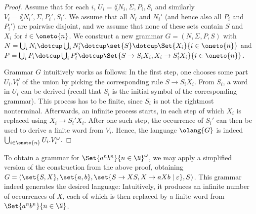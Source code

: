 \documentclass[../../diss.tex]{subfiles}
\begin{document}
\begin{proof}
    Assume that for each $i$, $U_i = \lang{N_i,\Sigma,P_i,S_i}$ and similarly $V_i = \lang{N_i',\Sigma,P_i',S_i'}$.
    We assume \wolog that all $N_i$ and $N_i'$ (and hence also all $P_i$ and $P_i'$) are pairwise disjoint, and we assume that none of these sets contain $S$ and $X_i$ for $i \in \oneto{n}$.
    We construct a new grammar $G = (N,\Sigma,P,S)$ with
    \(
        N = \bigcup_{i} N_i \dotcup \bigcup_{i} N'_i \dotcup \set{ S } \dotcup \Set{ X_i}{i \in \oneto{n}}
    \)
    and
    \(
        P = \bigcup_{i} P_i \dotcup \bigcup_{i} P_i' \dotcup \Set{ S \to S_i X_i, X_i \to S_i' X_i}{i \in \oneto{n}}
    \).

    Grammar $G$ intuitively works as follows:
    In the first step, one chooses some part $U_i . V_i^\omega$ of the union by picking the corresponding rule $S \to S_i X_i$.
    From $S_i$, a word in $U_i$ can be derived (recall that $S_i$ is the initial symbol of the corresponding grammar).
    This process has to be finite, since $S_i$ is not the rightmost nonterminal.
    Afterwards, an infinite process starts, in each step of which $X_i$ is replaced using $X_i \to S_i' X_i$.
    After one such step, the occurrence of $S_i'$ can then be used to derive a finite word from $V_i$.
    Hence, the language $\olang{G}$ is indeed \(\bigcup_{i \in \oneto{n}} U_i . V_i^\omega \).
\end{proof}

\begin{example}%
\label{Example:OmegaCFGAnBnOmega}%
    To obtain a grammar for $\Set{a^n b^n}{n \in \N}^\omega$, we may apply a simplified version of the construction from the above proof, obtaining $G = (\set{S,X},\set{a,b},\set{ S \to XS, X \to aXb \mid \eps},S)$.
    This grammar indeed generates the desired language:
    Intuitively, it produces an infinite number of occurrences of $X$, each of which is then replaced by a finite word from $\Set{a^n b^n}{n \in \N}$.
\end{example}
\end{document}
